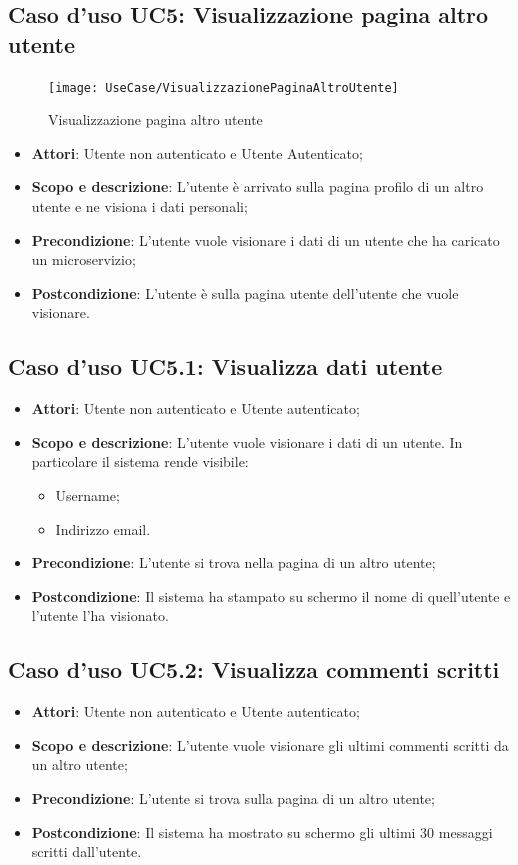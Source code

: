 \documentclass[12pt,a4paper,titlepage]{article}
\begin{document}
	\subsection{Caso d'uso UC5: Visualizzazione pagina altro utente}
	\label{UC5}
	\begin{figure}[H]
		\centering
		\texttt{[image: UseCase/VisualizzazionePaginaAltroUtente]}
		\caption{Visualizzazione pagina altro utente}
	\end{figure}
	\begin{itemize}
		\item \textbf{Attori}: Utente non autenticato e Utente Autenticato;
		\item \textbf{Scopo e descrizione}: L'utente è arrivato sulla pagina profilo di un altro utente e ne visiona i dati personali;
		\item \textbf{Precondizione}: L'utente vuole visionare i dati di un utente che ha caricato un microservizio;
		\item \textbf{Postcondizione}: L'utente è sulla pagina utente dell'utente che vuole visionare.
	\end{itemize}

	\subsection{Caso d'uso UC5.1: Visualizza dati utente}
	\label{UC5.1}
	\begin{itemize}
		\item \textbf{Attori}: Utente non autenticato e Utente autenticato;
		\item \textbf{Scopo e descrizione}: L'utente vuole visionare i dati di un utente. In particolare il sistema rende visibile:
		\begin{itemize}
			\item Username;
			\item Indirizzo email.
		\end{itemize}
		\item \textbf{Precondizione}: L'utente si trova nella pagina di un altro utente;
		\item \textbf{Postcondizione}: Il sistema ha stampato su schermo il nome di quell'utente e l'utente l'ha visionato.
	\end{itemize}

	\subsection{Caso d'uso UC5.2: Visualizza commenti scritti}
	\label{UC5.2}
	\begin{itemize}
		\item \textbf{Attori}: Utente non autenticato e Utente autenticato;
		\item \textbf{Scopo e descrizione}: L'utente vuole visionare gli ultimi commenti scritti da un altro utente;
		\item \textbf{Precondizione}: L'utente si trova sulla pagina di un altro utente;
		\item \textbf{Postcondizione}: Il sistema ha mostrato su schermo gli ultimi 30 messaggi scritti dall'utente.
	\end{itemize}
\end{document}
